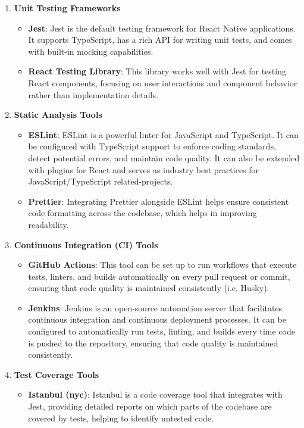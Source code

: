 \documentclass[12pt, titlepage]{article}
\begin{document}
\begin{enumerate}
	\item \textbf{Unit Testing Frameworks}
	\begin{itemize}
		\item \textbf{Jest}: Jest is the default testing framework for React Native applications. It supports TypeScript, has a rich API for writing unit tests, and comes with built-in mocking capabilities.
		\item \textbf{React Testing Library}: This library works well with Jest for testing React components, focusing on user interactions and component behavior rather than implementation details.
	\end{itemize}
	\item \textbf{Static Analysis Tools}
	\begin{itemize}
		\item \textbf{ESLint}: ESLint is a powerful linter for JavaScript and TypeScript. It can be configured with TypeScript support to enforce coding standards, detect potential errors, and maintain code quality. It can also be extended with plugins for React and serves as industry best practices for JavaScript/TypeScript related-projects.
		\item \textbf{Prettier}: Integrating Prettier alongside ESLint helps ensure consistent code formatting across the codebase, which helps in improving readability.
	\end{itemize}
	\item \textbf{Continuous Integration (CI) Tools}
	\begin{itemize}
		\item \textbf{GitHub Actions}: This tool can be set up to run workflows that execute tests, linters, and builds automatically on every pull request or commit, ensuring that code quality is maintained consistently (i.e. Husky).
		\item \textbf{Jenkins}: Jenkins is an open-source automation server that facilitates continuous integration and continuous deployment processes. It can be configured to automatically run tests, linting, and builds every time code is pushed to the repository, ensuring that code quality is maintained consistently.
	\end{itemize}
	\newpage
	\item \textbf{Test Coverage Tools}
	\begin{itemize}
		\item \textbf{Istanbul (nyc)}: Istanbul is a code coverage tool that integrates with Jest, providing detailed reports on which parts of the codebase are covered by tests, helping to identify untested code.

\end{itemize}
\end{enumerate}
\end{document}
